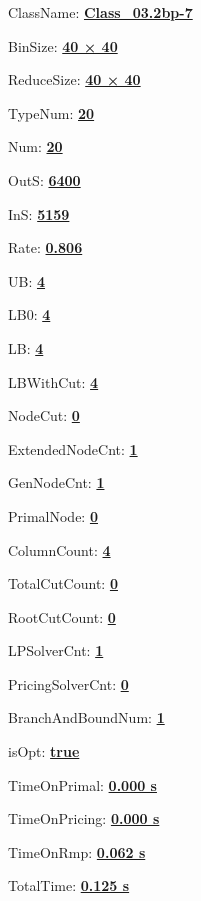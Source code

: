 \documentclass[11pt]{article}
\begin{document}
\pagestyle{empty}


ClassName: \underline{\textbf{Class_03.2bp-7}}
\par
BinSize: \underline{\textbf{40 × 40}}
\par
ReduceSize: \underline{\textbf{40 × 40}}
\par
TypeNum: \underline{\textbf{20}}
\par
Num: \underline{\textbf{20}}
\par
OutS: \underline{\textbf{6400}}
\par
InS: \underline{\textbf{5159}}
\par
Rate: \underline{\textbf{0.806}}
\par
UB: \underline{\textbf{4}}
\par
LB0: \underline{\textbf{4}}
\par
LB: \underline{\textbf{4}}
\par
LBWithCut: \underline{\textbf{4}}
\par
NodeCut: \underline{\textbf{0}}
\par
ExtendedNodeCnt: \underline{\textbf{1}}
\par
GenNodeCnt: \underline{\textbf{1}}
\par
PrimalNode: \underline{\textbf{0}}
\par
ColumnCount: \underline{\textbf{4}}
\par
TotalCutCount: \underline{\textbf{0}}
\par
RootCutCount: \underline{\textbf{0}}
\par
LPSolverCnt: \underline{\textbf{1}}
\par
PricingSolverCnt: \underline{\textbf{0}}
\par
BranchAndBoundNum: \underline{\textbf{1}}
\par
isOpt: \underline{\textbf{true}}
\par
TimeOnPrimal: \underline{\textbf{0.000 s}}
\par
TimeOnPricing: \underline{\textbf{0.000 s}}
\par
TimeOnRmp: \underline{\textbf{0.062 s}}
\par
TotalTime: \underline{\textbf{0.125 s}}
\par
\newpage


\end{document}
